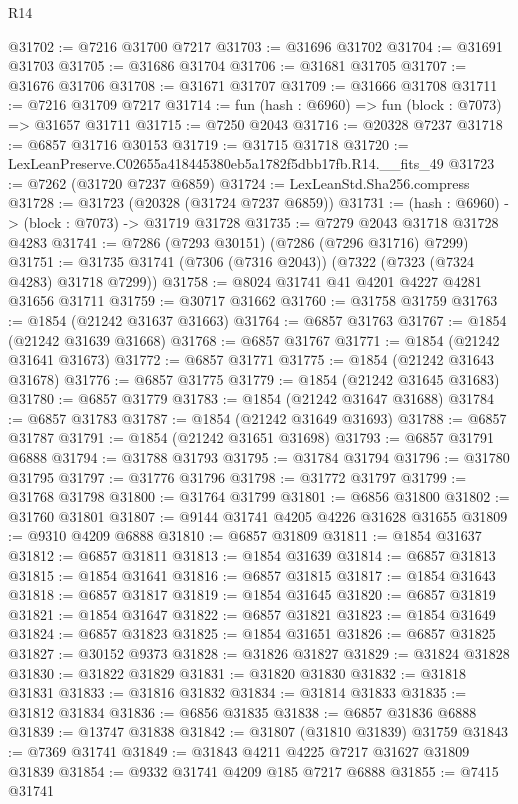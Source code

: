 \begin{lexlean}{R14}
\begin{coremodule}
@31702 := @7216 @31700 @7217
@31703 := @31696 @31702
@31704 := @31691 @31703
@31705 := @31686 @31704
@31706 := @31681 @31705
@31707 := @31676 @31706
@31708 := @31671 @31707
@31709 := @31666 @31708
@31711 := @7216 @31709 @7217
@31714 := fun (hash : @6960) => fun (block : @7073) => @31657 @31711
@31715 := @7250 @2043
@31716 := @20328 @7237
@31718 := @6857 @31716 @30153
@31719 := @31715 @31718
@31720 := LexLeanPreserve.C02655a418445380eb5a1782f5dbb17fb.R14.__fits_49
@31723 := @7262 (@31720 @7237 @6859)
@31724 := LexLeanStd.Sha256.compress
@31728 := @31723 (@20328 (@31724 @7237 @6859))
@31731 := (hash : @6960) -> (block : @7073) -> @31719 @31728
@31735 := @7279 @2043 @31718 @31728 @4283
@31741 := @7286 (@7293 @30151) (@7286 (@7296 @31716) @7299)
@31751 := @31735 @31741 (@7306 (@7316 @2043)) (@7322 (@7323 (@7324 @4283) @31718 @7299))
@31758 := @8024 @31741 @41 @4201 @4227 @4281 @31656 @31711
@31759 := @30717 @31662
@31760 := @31758 @31759
@31763 := @1854 (@21242 @31637 @31663)
@31764 := @6857 @31763
@31767 := @1854 (@21242 @31639 @31668)
@31768 := @6857 @31767
@31771 := @1854 (@21242 @31641 @31673)
@31772 := @6857 @31771
@31775 := @1854 (@21242 @31643 @31678)
@31776 := @6857 @31775
@31779 := @1854 (@21242 @31645 @31683)
@31780 := @6857 @31779
@31783 := @1854 (@21242 @31647 @31688)
@31784 := @6857 @31783
@31787 := @1854 (@21242 @31649 @31693)
@31788 := @6857 @31787
@31791 := @1854 (@21242 @31651 @31698)
@31793 := @6857 @31791 @6888
@31794 := @31788 @31793
@31795 := @31784 @31794
@31796 := @31780 @31795
@31797 := @31776 @31796
@31798 := @31772 @31797
@31799 := @31768 @31798
@31800 := @31764 @31799
@31801 := @6856 @31800
@31802 := @31760 @31801
@31807 := @9144 @31741 @4205 @4226 @31628 @31655
@31809 := @9310 @4209 @6888
@31810 := @6857 @31809
@31811 := @1854 @31637
@31812 := @6857 @31811
@31813 := @1854 @31639
@31814 := @6857 @31813
@31815 := @1854 @31641
@31816 := @6857 @31815
@31817 := @1854 @31643
@31818 := @6857 @31817
@31819 := @1854 @31645
@31820 := @6857 @31819
@31821 := @1854 @31647
@31822 := @6857 @31821
@31823 := @1854 @31649
@31824 := @6857 @31823
@31825 := @1854 @31651
@31826 := @6857 @31825
@31827 := @30152 @9373
@31828 := @31826 @31827
@31829 := @31824 @31828
@31830 := @31822 @31829
@31831 := @31820 @31830
@31832 := @31818 @31831
@31833 := @31816 @31832
@31834 := @31814 @31833
@31835 := @31812 @31834
@31836 := @6856 @31835
@31838 := @6857 @31836 @6888
@31839 := @13747 @31838
@31842 := @31807 (@31810 @31839) @31759
@31843 := @7369 @31741
@31849 := @31843 @4211 @4225 @7217 @31627 @31809 @31839
@31854 := @9332 @31741 @4209 @185 @7217 @6888
@31855 := @7415 @31741

\end{coremodule}
\end{lexlean}
